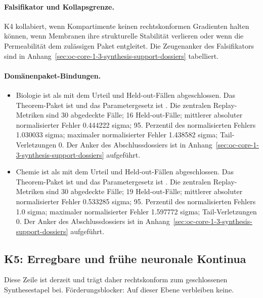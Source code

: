 \paragraph{Falsifikator und Kollapsgrenze.}
K4 kollabiert, wenn Kompartimente keinen rechtskonformen Gradienten halten können, wenn Membranen ihre strukturelle Stabilität verlieren oder wenn die Permeabilität dem zulässigen Paket entgleitet.
Die Zeugenanker des Falsifikators sind in Anhang~\ref{sec:oc-core-1-3-synthesis-support-dossiers} tabelliert.

\paragraph{Domänenpaket-Bindungen.}
\begin{itemize}[leftmargin=1.6em,nosep]
\item Biologie ist als  mit dem Urteil  und  Held-out-Fällen abgeschlossen. Das Theorem-Paket ist  und das Parametergesetz ist . Die zentralen Replay-Metriken sind 30 abgedeckte Fälle; 16 Held-out-Fälle; mittlerer absoluter normalisierter Fehler 0.444222 sigma; 95. Perzentil des normalisierten Fehlers 1.030033 sigma; maximaler normalisierter Fehler 1.438582 sigma; Tail-Verletzungen 0. Der Anker des Abschlussdossiers ist in Anhang~\ref{sec:oc-core-1-3-synthesis-support-dossiers} aufgeführt.
\item Chemie ist als  mit dem Urteil  und  Held-out-Fällen abgeschlossen. Das Theorem-Paket ist  und das Parametergesetz ist . Die zentralen Replay-Metriken sind 30 abgedeckte Fälle; 19 Held-out-Fälle; mittlerer absoluter normalisierter Fehler 0.533285 sigma; 95. Perzentil des normalisierten Fehlers 1.0 sigma; maximaler normalisierter Fehler 1.597772 sigma; Tail-Verletzungen 0. Der Anker des Abschlussdossiers ist in Anhang~\ref{sec:oc-core-1-3-synthesis-support-dossiers} aufgeführt.
\end{itemize}

\subsection{K5: Erregbare und frühe neuronale Kontinua}
\label{sec:oc-core-1-3-synthesis-k5}
Diese Zeile ist derzeit  und trägt daher rechtskonform zum geschlossenen Synthesestapel bei.
Förderungsblocker: Auf dieser Ebene verbleiben keine.

